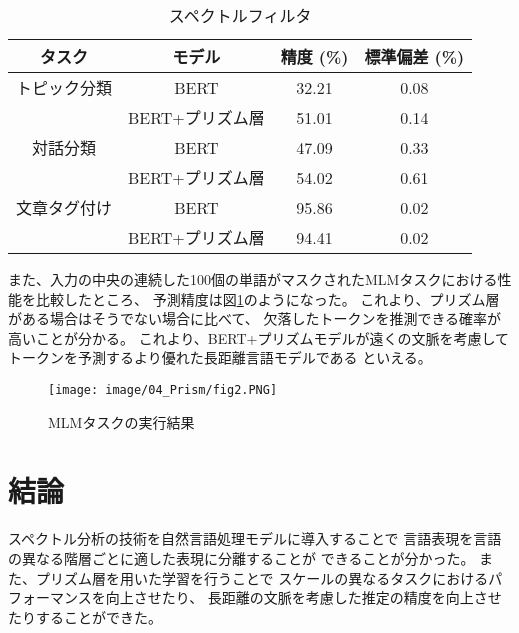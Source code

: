\documentclass{jsarticle}
\begin{document}
\begin{table}[H]
  \begin{center}
    \caption{スペクトルフィルタ}
    \begin{tabular}{cccc} \hline
      タスク       & モデル           & 精度 (\%) & 標準偏差 (\%)  \\ \hline 
      トピック分類 & BERT             & 32.21     & 0.08    \\
                  & BERT+プリズム層   & 51.01     & 0.14  \\\hline 
      対話分類     & BERT             & 47.09     & 0.33  \\ 
                  & BERT+プリズム層   & 54.02     & 0.61 \\\hline 
      文章タグ付け & BERT             & 95.86     & 0.02 \\
                  & BERT+プリズム層   & 94.41     & 0.02 
      \\ \hline
    \end{tabular}
    \label{tab:tab2}
  \end{center}
\end{table}

また、入力の中央の連続した100個の単語がマスクされたMLMタスクにおける性能を比較したところ、
予測精度は図\ref{fig:fig2}のようになった。
これより、プリズム層がある場合はそうでない場合に比べて、
欠落したトークンを推測できる確率が高いことが分かる。
これより、BERT+プリズムモデルが遠くの文脈を考慮してトークンを予測するより優れた長距離言語モデルである
といえる。

\begin{figure}[H]
  \begin{center}
    \texttt{[image: image/04\_Prism/fig2.PNG]}
    \caption{MLMタスクの実行結果}
    \label{fig:fig2}
  \end{center}
\end{figure}

\section{結論}
スペクトル分析の技術を自然言語処理モデルに導入することで
言語表現を言語の異なる階層ごとに適した表現に分離することが
できることが分かった。
また、プリズム層を用いた学習を行うことで
スケールの異なるタスクにおけるパフォーマンスを向上させたり、
長距離の文脈を考慮した推定の精度を向上させたりすることができた。
\end{document}
